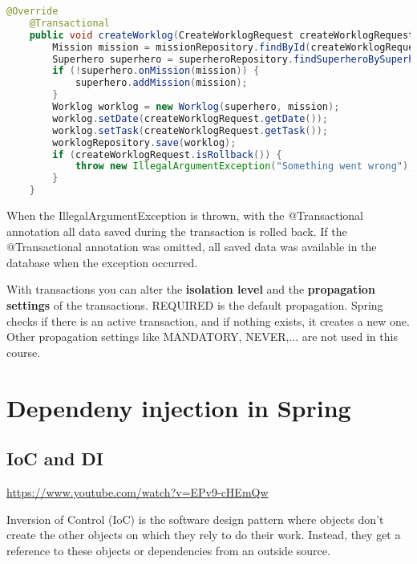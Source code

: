 \begin{lstlisting}[frame=single, language=java]
@Override
	@Transactional
	public void createWorklog(CreateWorklogRequest createWorklogRequest) {
		Mission mission = missionRepository.findById(createWorklogRequest.getMissionId()).orElseThrow(() -> new ResourceNotFoundException("Mission", "ID", createWorklogRequest.getMissionId()));
		Superhero superhero = superheroRepository.findSuperheroBySuperheroName(createWorklogRequest.getSuperheroName()).orElseThrow(() -> new ResourceNotFoundException("Superhero", "SuperheroName", createWorklogRequest.getSuperheroName()));
		if (!superhero.onMission(mission)) {
			superhero.addMission(mission);
		}
		Worklog worklog = new Worklog(superhero, mission);
		worklog.setDate(createWorklogRequest.getDate());
		worklog.setTask(createWorklogRequest.getTask());
		worklogRepository.save(worklog);
		if (createWorklogRequest.isRollback()) {
			throw new IllegalArgumentException("Something went wrong");
		}
	}
\end{lstlisting}

When the IllegalArgumentException is thrown, with the @Transactional annotation all data saved during the transaction is rolled back.  If the @Transactional annotation was omitted, all saved data was available in the database when the exception occurred.

With transactions you can alter the \textbf{isolation level} and the \textbf{propagation settings} of the transactions.  REQUIRED is the default propagation. Spring checks if there is an active transaction, and if nothing exists, it creates a new one.  Other propagation settings like MANDATORY, NEVER,... are not used in this course. \cite{transactions}

\section{Dependeny injection in Spring}

\subsection{IoC and DI}

\url{https://www.youtube.com/watch?v=EPv9-cHEmQw}

Inversion of Control (IoC) is the software design pattern where objects don't create the other objects on which they rely to do their work.   Instead, they get a reference to these objects or dependencies  from an outside source.  

